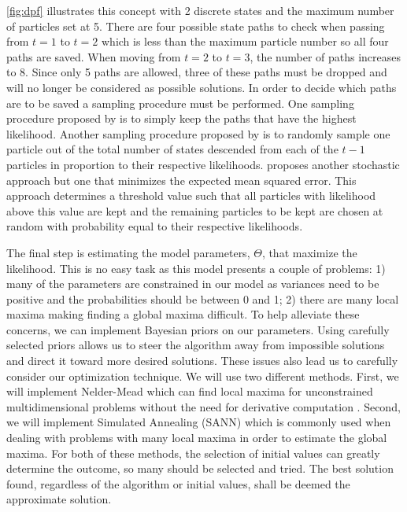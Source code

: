 \documentclass[12pt]{article}
\begin{document}
\autoref{fig:dpf} illustrates this concept with 2 discrete states and
the maximum number of particles set at 5. There are four possible state
paths to check when passing from \(t=1\) to \(t=2\) which is less than
the maximum particle number so all four paths are saved. When moving
from \(t=2\) to \(t=3\), the number of paths increases to 8. Since only
5 paths are allowed, three of these paths must be dropped and will no
longer be considered as possible solutions. In order to decide which
paths are to be saved a sampling procedure must be performed. One
sampling procedure proposed by \citet{tugnait_detection_1982} is to
simply keep the paths that have the highest likelihood. Another sampling
procedure proposed by \citet{akashi_random_1977} is to randomly sample
one particle out of the total number of states descended from each of
the \(t-1\) particles in proportion to their respective likelihoods.
\citet{fearnhead_-line_2003} proposes another stochastic approach but
one that minimizes the expected mean squared error. This approach
determines a threshold value such that all particles with likelihood
above this value are kept and the remaining particles to be kept are
chosen at random with probability equal to their respective likelihoods.

The final step is estimating the model parameters, \(\Theta\), that
maximize the likelihood. This is no easy task as this model presents a
couple of problems: 1) many of the parameters are constrained in our
model as variances need to be positive and the probabilities should be
between 0 and 1; 2) there are many local maxima making finding a global
maxima difficult. To help alleviate these concerns, we can implement
Bayesian priors on our parameters. Using carefully selected priors
allows us to steer the algorithm away from impossible solutions and
direct it toward more desired solutions. These issues also lead us to
carefully consider our optimization technique. We will use two different
methods. First, we will implement Nelder-Mead which can find local
maxima for unconstrained multidimensional problems without the need for
derivative computation \citet{nelder_simplex_1965}. Second, we will
implement Simulated Annealing (SANN) which is commonly used when dealing
with problems with many local maxima in order to estimate the global
maxima. For both of these methods, the selection of initial values can
greatly determine the outcome, so many should be selected and tried. The
best solution found, regardless of the algorithm or initial values,
shall be deemed the approximate solution.
\end{document}
